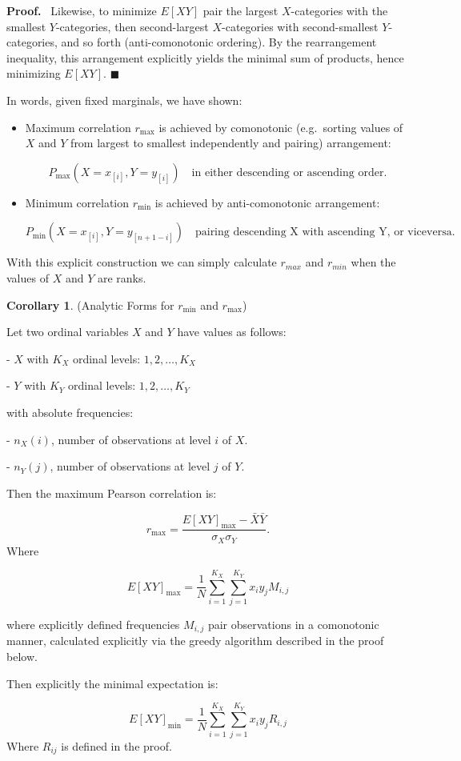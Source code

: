\documentclass[
  12pt,
]{article}
\theoremstyle{plain}
\theoremstyle{definition}
\newtheorem{corollary}{Corollary}
\renewenvironment{proof}
   {\par\noindent\textbf{Proof.}\ }
   {\hfill$\blacksquare$\par}
\theoremstyle{remark}
\begin{document}
\begin{proof}
Likewise, to minimize \(E[XY]\) pair the largest \(X\)-categories with
the smallest \(Y\)-categories, then second-largest \(X\)-categories with
second-smallest \(Y\)-categories, and so forth (anti-comonotonic
ordering). By the rearrangement inequality, this arrangement explicitly
yields the minimal sum of products, hence minimizing \(E[XY]\).
\end{proof}

In words, given fixed marginals, we have shown:

\begin{itemize}
\item
  Maximum correlation \(r_{\text{max}}\) is achieved by comonotonic
  (e.g.~sorting values of \(X\) and \(Y\) from largest to smallest
  independently and pairing) arrangement:

  \[P_{\text{max}}(X=x_{[i]}, Y=y_{[i]}) \quad\text{in either descending or ascending order.}\]
\item
  Minimum correlation \(r_{\text{min}}\) is achieved by anti-comonotonic
  arrangement:

  \[P_{\text{min}}(X=x_{[i]}, Y=y_{[n+1-i]}) \quad\text{pairing descending X with ascending Y, or viceversa.}\]
\end{itemize}

With this explicit construction we can simply calculate \(r_{max}\) and
\(r_{min}\) when the values of \(X\) and \(Y\) are ranks.

\label{corr-min}
\begin{corollary} {(Analytic Forms for $r_{\min}$ and $r_{\max}$)}


Let two ordinal variables $X$ and $Y$ have values as follows:

- $X$ with $K_X$ ordinal levels: $1,2,\dots,K_X$
    
- $Y$ with $K_Y$ ordinal levels: $1,2,\dots,K_Y$
    
with absolute frequencies:

- $n_{X}(i)$, number of observations at level $i$ of $X$.
    
- $n_{Y}(j)$, number of observations at level $j$ of $Y$.
    

Then the maximum Pearson correlation is:

$$r_{\text{max}} = \frac{E[XY]_{\text{max}} - \bar{X}\bar{Y}}{\sigma_X \sigma_Y}.$$
Where 

$$
E[XY]_{\max} =\frac{1}{N}\sum_{i=1}^{K_X}\sum_{j=1}^{K_Y}x_i y_j M_{i,j}
$$

where explicitly defined frequencies $M_{i,j}$ pair observations in a comonotonic manner, calculated explicitly via the greedy algorithm described in the proof below.


Then explicitly the minimal expectation is:

$$E[XY]_{\text{min}}=\frac{1}{N}\sum_{i=1}^{K_X}\sum_{j=1}^{K_Y} x_i y_j R_{i,j}$$
Where $R_{ij}$ is defined in the proof.
\end{corollary}
\end{document}
